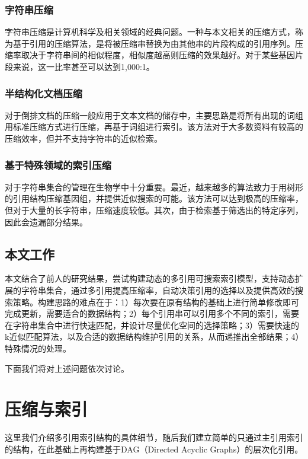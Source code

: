 ﻿\documentclass{sysuthesis}
\begin{document}
\subsection{字符串压缩}
字符串压缩是计算机科学及相关领域的经典问题。一种与本文相关的压缩方式，称为基于引用的压缩算法\cite{deorowicz2011robust, pinho2012green}，是将被压缩串替换为由其他串的片段构成的引用序列。压缩率取决于字符串间的相似程度，相似度越高则压缩的效果越好。对于某些基因片段来说，这一比率甚至可以达到1,000:1\cite{wandelt2013fresco}。



\subsection{半结构化文档压缩}
对于倒排文档\cite{claude2011indexes}的压缩一般应用于文本文档的储存中，主要思路是将所有出现的词组用标准压缩方式进行压缩，再基于词组进行索引。该方法对于大多数资料有较高的压缩效率\cite{hoobin2011relative}，但并不支持字符串的近似检索。



\subsection{基于特殊领域的索引压缩}
对于字符串集合的管理在生物学中十分重要。最近，越来越多的算法致力于用树形的引用结构压缩基因组，并提供近似搜索的可能\cite{yang2013efficient}。该方法可以达到极高的压缩率\cite{danek2014indexes}，但对于大量的长字符串，压缩速度较低。其次，由于检索基于筛选出的特定序列\cite{siren2014indexing}，因此会遗漏部分结果。



\section{本文工作}
本文结合了前人的研究结果，尝试构建动态的多引用可搜索索引模型，支持动态扩展的字符串集合，通过多引用提高压缩率，自动决策引用的选择以及提供高效的搜索策略。构建思路的难点在于：1）每次要在原有结构的基础上进行简单修改即可完成更新，需要适合的数据结构；2）每个引用串可以引用多个不同的索引，需要在字符串集合中进行快速匹配，并设计尽量优化空间的选择策略；3）需要快速的k近似匹配算法，以及合适的数据结构维护引用的关系，从而递推出全部结果；4）特殊情况的处理。\par
下面我们将对上述问题依次讨论。



\chapter{压缩与索引}
这里我们介绍多引用索引结构\cite{wandelt2015mrcsi}的具体细节，随后我们建立简单的只通过主引用索引的结构，在此基础上再构建基于DAG（Directed Acyclic Graphs）的层次化引用。
\end{document}
